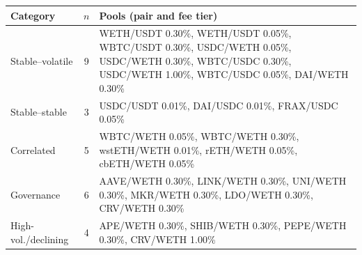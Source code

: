 \begin{tabular}{@{}l@{\hspace{3pt}}c@{\hspace{3pt}}>{\raggedright\arraybackslash}p{}@{}}
\toprule
Category & $n$ & Pools (pair and fee tier) \\
\midrule
Stable--volatile & 9 & WETH/USDT 0.30\%, WETH/USDT 0.05\%, WBTC/USDT 0.30\%, USDC/WETH 0.05\%, USDC/WETH 0.30\%, WBTC/USDC 0.30\%, USDC/WETH 1.00\%, WBTC/USDC 0.05\%, DAI/WETH 0.30\% \\
Stable--stable & 3 & USDC/USDT 0.01\%, DAI/USDC 0.01\%, FRAX/USDC 0.05\% \\
Correlated & 5 & WBTC/WETH 0.05\%, WBTC/WETH 0.30\%, wstETH/WETH 0.01\%, rETH/WETH 0.05\%, cbETH/WETH 0.05\% \\
Governance & 6 & AAVE/WETH 0.30\%, LINK/WETH 0.30\%, UNI/WETH 0.30\%, MKR/WETH 0.30\%, LDO/WETH 0.30\%, CRV/WETH 0.30\% \\
High-vol./declining & 4 & APE/WETH 0.30\%, SHIB/WETH 0.30\%, PEPE/WETH 0.30\%, CRV/WETH 1.00\% \\
\bottomrule
\end{tabular}
